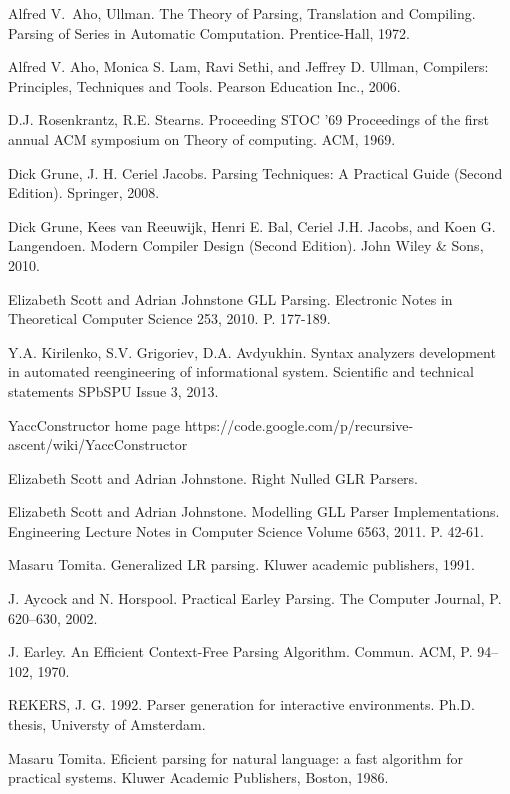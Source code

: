 \begin{thebibliography}{99}

Alfred V.~Aho, Ullman. The Theory of Parsing, Translation and Compiling. Parsing of Series in Automatic Computation. Prentice-Hall, 1972.

Alfred V. Aho, Monica S. Lam, Ravi Sethi, and Jeffrey D. Ullman, Compilers: Principles, Techniques and Tools. Pearson Education Inc., 2006.

D.J. Rosenkrantz, R.E. Stearns. Proceeding STOC '69 Proceedings of the first annual ACM symposium on Theory of computing. ACM, 1969.

Dick Grune, J. H. Ceriel Jacobs. Parsing Techniques: A Practical Guide (Second Edition). Springer, 2008.

Dick Grune, Kees van Reeuwijk, Henri E. Bal, Ceriel J.H. Jacobs, and Koen G. Langendoen. Modern Compiler Design (Second Edition). John Wiley \& Sons, 2010.

Elizabeth Scott and Adrian Johnstone GLL Parsing. Electronic Notes in Theoretical Computer Science 253, 2010. P. 177-189.

Y.A. Kirilenko, S.V. Grigoriev, D.A. Avdyukhin. Syntax analyzers development in automated reengineering of informational system. Scientific and technical statements SPbSPU Issue 3, 2013.

\relax YaccConstructor home page https://code.google.com/p/recursive-ascent/wiki/YaccConstructor

Elizabeth Scott and Adrian Johnstone. Right Nulled GLR Parsers.

Elizabeth Scott and Adrian Johnstone. Modelling GLL Parser Implementations. Engineering Lecture Notes in Computer Science Volume 6563, 2011. P. 42-61.

Masaru Tomita. Generalized LR parsing. Kluwer academic publishers, 1991.

J. Aycock and N. Horspool. Practical Earley Parsing. The Computer Journal, P. 620–630, 2002.

J. Earley. An Eﬃcient Context-Free Parsing Algorithm. Commun. ACM, P. 94–102, 1970.

REKERS, J. G. 1992. Parser generation for interactive environments. Ph.D. thesis, Universty of Amsterdam.

Masaru Tomita. Eficient parsing for natural language: a fast algorithm for practical systems. Kluwer Academic Publishers, Boston, 1986.


\end{thebibliography}
